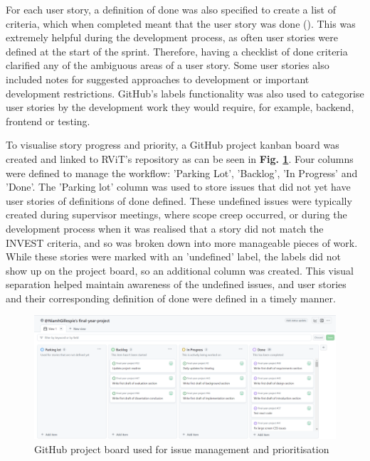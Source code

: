 \documentclass[l4proj.tex]{subfiles}
\begin{document}
For each user story, a definition of done was also specified to create a list of criteria, which when completed meant that the user story was done (\cite{Silva2017}). This was extremely helpful during the development process, as often user stories were defined at the start of the sprint. Therefore, having a checklist of done criteria clarified any of the ambiguous areas of a user story. Some user stories also included notes for suggested approaches to development or important development restrictions. GitHub's labels functionality was also used to categorise user stories by the development work they would require, for example, backend, frontend or testing. 

To visualise story progress and priority, a GitHub project kanban board was created and linked to RViT's repository as can be seen in \textbf{Fig. \ref{fig:My Github issue board}}. Four columns were defined to manage the workflow: 'Parking Lot', 'Backlog', 'In Progress' and 'Done'. The 'Parking lot' column was used to store issues that did not yet have user stories of definitions of done defined. These undefined issues were typically created during supervisor meetings, where scope creep occurred, or during the development process when it was realised that a story did not match the INVEST criteria, and so was broken down into more manageable pieces of work. While these stories were marked with an 'undefined' label, the labels did not show up on the project board, so an additional column was created. This visual separation helped maintain awareness of the undefined issues, and user stories and their corresponding definition of done were defined in a timely manner.

\begin{figure}[h!]
\begin{center}
\includegraphics[scale=0.4]{dissertation/images/ImplementationIssueBoard.png}
\caption{GitHub project board used for issue management and prioritisation}
\label{fig:My Github issue board} 
\end{center}
\end{figure}
\end{document}
